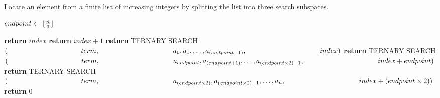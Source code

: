 \documentclass[a4paper, 12pt]{article}
\DeclarePairedDelimiter{\floor}{\lfloor}{\rfloor}
\begin{document}
	
	\begin{algorithm}

		\renewcommand{\thealgorithm}{3.1.27}
		
		\caption{Locate an element from a finite list of increasing integers by splitting the list into three search subspaces.}
		
		\begin{algorithmic}[1]
			
			
			\State $endpoint \gets \floor{\frac{n}{3}}$
			
			 
					\State \textbf{return} $index$
				\Else
					\State \textbf{return} $index + 1$
				\EndIf
			 
				\State \textbf{return} TERNARY SEARCH$(\newline \indent \indent \indent \indent \indent \indent \indent term, \newline \indent \indent \indent \indent \indent \indent \indent a_0, a_1, \dots, a_{(endpoint-1)},\newline \indent \indent \indent \indent \indent \indent \indent index)$
				\State \textbf{return} TERNARY SEARCH$(\newline \indent \indent \indent \indent \indent \indent \indent term,\newline \indent \indent \indent \indent \indent \indent \indent a_{endpoint}, a_{(endpoint+1)}, \dots, a_{(endpoint \times 2)-1}, \newline \indent \indent \indent \indent \indent \indent \indent index + endpoint)$
				\State \textbf{return} TERNARY SEARCH$(\newline \indent \indent \indent \indent \indent \indent \indent term,\newline \indent \indent \indent \indent \indent \indent \indent a_{(endpoint \times 2)}, a_{(endpoint \times 2)+1}, \dots, a_n,\newline \indent \indent \indent \indent \indent \indent \indent index+(endpoint \times 2))$
			\Else
				\State \textbf{return} $0$ 
			\EndIf
			\EndProcedure
			
		\end{algorithmic}

	\end{algorithm}
\end{document}
